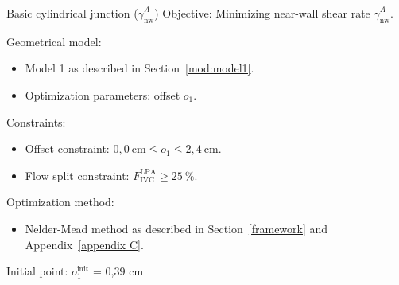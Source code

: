 \begin{optimproblem}{Basic cylindrical junction ($\dot{\gamma}^{A}_{\text{nw}}$)}
	\vspace{2mm}
	Objective:  Minimizing near-wall shear rate $\dot{\gamma}^{A}_{\text{nw}}$.
	
	\vspace{2mm}
	Geometrical model:
	\begin{itemize}
		\item Model 1 as described in Section~\ref{mod:model1}.
		\item Optimization parameters: offset $o_1$.
	\end{itemize}
	Constraints:
	\begin{itemize}
		\item Offset constraint: $0{,}0~\text{cm} \leq o_1 \leq 2{,}4~\text{cm}$.
		\item Flow split constraint: $F^{\text{LPA}}_{\text{IVC}} \geq 25~\%$.
	\end{itemize}
	Optimization method:
	\begin{itemize}
		\item Nelder-Mead method as described in Section~\ref{framework} and Appendix~\ref{appendix C}.
	\end{itemize}
	Initial point: $o^{\text{init}}_{1}$ = 0{,}39 cm
	\label{optimprob:1}
\end{optimproblem}
\vspace{-5mm}

